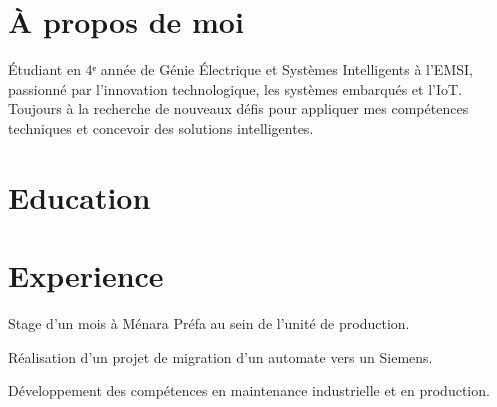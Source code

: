 \documentclass[]{plushcv}
\begin{document}
\begin{minipage}[t]{0.72\textwidth} 



\section{À propos de moi}
Étudiant en 4ᵉ année de Génie Électrique et Systèmes Intelligents \`a l'EMSI, passionné par l'innovation technologique, les systèmes embarqués et l'IoT. Toujours à la recherche de nouveaux défis pour appliquer mes compétences techniques et concevoir des solutions intelligentes.
\sectionsep
\section{Education}
\hfill{}

\sectionsep
{} {}
\hfill{}

\sectionsep
{}
\hfill{}
\sectionsep
\section{Experience}

\hfill{}
\vspace{\topsep} %
\begin{tightemize}
\sectionsep
\item Stage d'un mois à Ménara Préfa au sein de l'unité de production.
\item Réalisation d'un projet de migration d'un automate vers un Siemens.
\item Développement des compétences en maintenance industrielle et en production.  
\end{tightemize}



\end{minipage}
\end{document}
